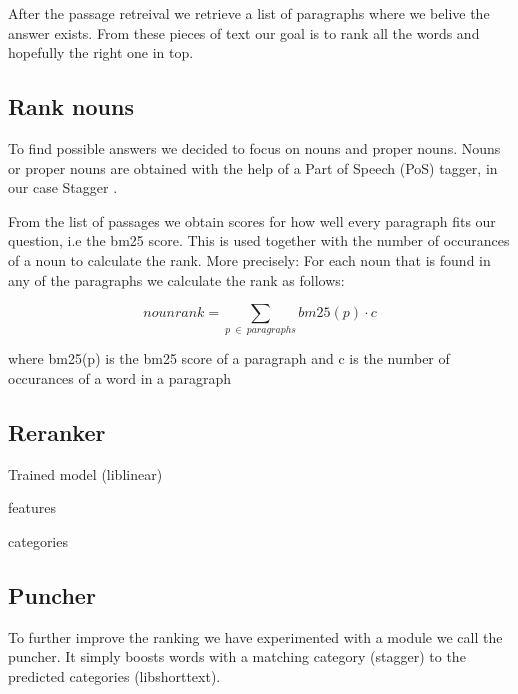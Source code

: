 After the passage retreival we retrieve a list of paragraphs where we belive the answer exists. 
From these pieces of text our goal is to rank all the words and hopefully the right one in top.

\subsection{Rank nouns}

To find possible answers we decided to focus on nouns and proper nouns. 
Nouns or proper nouns are obtained with the help of a Part of Speech (PoS) tagger, in our case Stagger \cite{stagger}.

From the list of passages we obtain scores for how well every paragraph fits our question, i.e the bm25 score. 
This is used together with the number of occurances of a noun to calculate the rank.
More precisely: For each noun that is found in any of the paragraphs we calculate the rank as follows:

\[ nounrank = \sum_{p\:\in\:paragraphs}bm25(p) \cdot c \]

where bm25(p) is the bm25 score of a paragraph and c is the number of occurances of a word in a paragraph

\subsection{Reranker}

Trained model (liblinear)

features

categories

\subsection{Puncher}

To further improve the ranking we have experimented with a module we call the puncher. It simply boosts 
words with a matching category (stagger) to the predicted categories (libshorttext). 